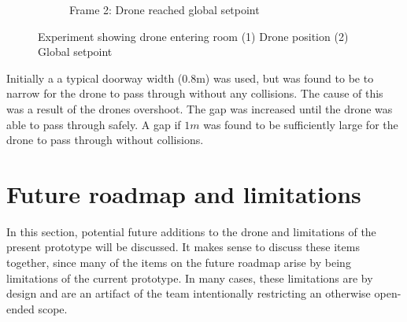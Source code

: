 \documentclass[capstone_report.tex]{subfiles}
\begin{document}
\begin{figure}[H]
\begin{subfigure}{0.5\textwidth}
        \caption{Frame 2: Drone reached global setpoint}
        \label{fig:enter_room_2}
    \end{subfigure}
    \caption{Experiment showing drone entering room (1) Drone position (2) Global setpoint\label{fig:enter_room}}
\end{figure}

Initially a a typical doorway width (0.8m) was used, but was found to be to narrow for the drone to pass through without any collisions.  The cause of this was a result of the drones overshoot.  The gap was increased until the drone was able to pass through safely.  A gap if $1m$ was found to be sufficiently large for the drone to pass through without collisions.

\section{Future roadmap and limitations}
In this section, potential future additions to the drone and limitations of the present prototype will be discussed.  It makes sense to discuss these items together, since many of the items on the future roadmap arise by being limitations of the current prototype. In many cases, these limitations are by design and are an artifact of the team intentionally restricting an otherwise open-ended scope. \\
\end{document}
